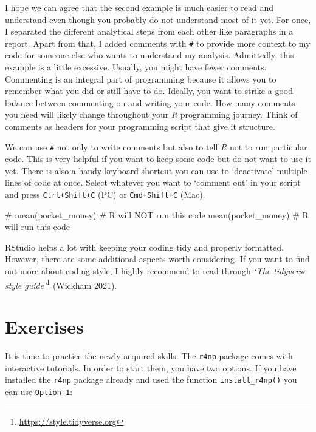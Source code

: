 \documentclass[
  letterpaper,
]{krantz}
\makeatletter
\newenvironment{Shaded}{\begin{snugshade}}{\end{snugshade}}
\newcommand{\CommentTok}[1]{\textcolor[rgb]{0.37,0.37,0.37}{#1}}
\newcommand{\FunctionTok}[1]{\textcolor[rgb]{0.28,0.35,0.67}{#1}}
\newcommand{\NormalTok}[1]{\textcolor[rgb]{0.00,0.23,0.31}{#1}}
\renewcommand{\href}[2]{#2\footnote{\url{#1}}}
\newenvironment{kframe}{%
\medskip{}
\setlength{\fboxsep}{.8em}
 \def\at@end@of@kframe{}%
 \ifinner\ifhmode%
  \def\at@end@of@kframe{\end{minipage}}%
  \begin{minipage}{\columnwidth}%
 \fi\fi%
 \def\FrameCommand##1{\hskip\@totalleftmargin \hskip-\fboxsep
 \colorbox{shadecolor}{##1}\hskip-\fboxsep
     \hskip-\linewidth \hskip-\@totalleftmargin \hskip\columnwidth}%
 \MakeFramed {\advance\hsize-\width
   \@totalleftmargin\z@ \linewidth\hsize
   \@setminipage}}%
 {\par\unskip\endMakeFramed%
 \at@end@of@kframe}
\renewenvironment{Shaded}{\begin{kframe}}{\end{kframe}}
\makeatother
\begin{document}
I hope we can agree that the second example is much easier to read and
understand even though you probably do not understand most of it yet.
For once, I separated the different analytical steps from each other
like paragraphs in a report. Apart from that, I added comments with
\texttt{\#} to provide more context to my code for someone else who
wants to understand my analysis. Admittedly, this example is a little
excessive. Usually, you might have fewer comments. Commenting is an
integral part of programming because it allows you to remember what you
did or still have to do. Ideally, you want to strike a good balance
between commenting on and writing your code. How many comments you need
will likely change throughout your \emph{R} programming journey. Think
of comments as headers for your programming script that give it
structure.

We can use \texttt{\#} not only to write comments but also to tell
\emph{R} not to run particular code. This is very helpful if you want to
keep some code but do not want to use it yet. There is also a handy
keyboard shortcut you can use to `deactivate' multiple lines of code at
once. Select whatever you want to `comment out' in your script and press
\texttt{Ctrl+Shift+C} (PC) or \texttt{Cmd+Shift+C} (Mac).

\begin{Shaded}
\begin{Highlighting}[]
\CommentTok{\# mean(pocket\_money) \# R will NOT run this code}
\FunctionTok{mean}\NormalTok{(pocket\_money)   }\CommentTok{\# R will run this code}
\end{Highlighting}
\end{Shaded}

RStudio helps a lot with keeping your coding tidy and properly
formatted. However, there are some additional aspects worth considering.
If you want to find out more about coding style, I highly recommend to
read through \href{https://style.tidyverse.org}{\emph{`The tidyverse
style guide'}} (Wickham 2021).\\

\section{Exercises}\label{sec-exercises-r_basics}

It is time to practice the newly acquired skills. The \texttt{r4np}
package comes with interactive tutorials. In order to start them, you
have two options. If you have installed the \texttt{r4np} package
already and used the function \texttt{install\_r4np()} you can use
\texttt{Option\ 1}:
\end{document}
